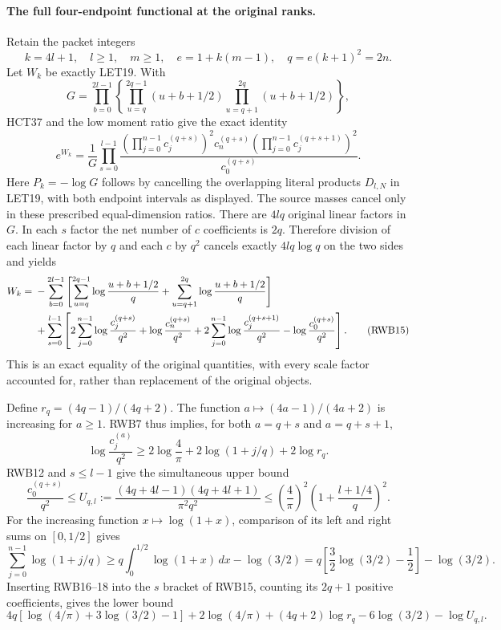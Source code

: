 \documentclass[11pt,a4paper]{article}
\begin{document}
\paragraph{The full four-endpoint functional at the original ranks.}
Retain the packet integers
\[
 k=4l+1,\quad l\ge1,\quad m\ge1,\quad
 e=1+k(m-1),\quad q=e(k+1)^2=2n.
 \tag{RWB13}
\]
Let $W_k$ be exactly LET19. With
\[
 G=\prod_{b=0}^{2l-1}
 \left\{\prod_{u=q}^{2q-1}(u+b+1/2)
         \prod_{u=q+1}^{2q}(u+b+1/2)\right\},
\]
HCT37 and the low moment ratio give the exact identity
\[
 e^{W_k}=\frac1G\prod_{s=0}^{l-1}
 \frac{\displaystyle
       \left(\prod_{j=0}^{n-1}c_j^{(q+s)}\right)^2
       c_n^{(q+s)}
       \left(\prod_{j=0}^{n-1}c_j^{(q+s+1)}\right)^2}
      {c_0^{(q+s)}}.
 \tag{RWB14}
\]
Here $P_k=-\log G$ follows by cancelling the overlapping literal
products $D_{l,N}$ in LET19, with both endpoint intervals as displayed.
The source masses cancel only in these prescribed equal-dimension
ratios. There are $4lq$ original linear factors in $G$. In each $s$
factor the net number of $c$ coefficients is $2q$. Therefore division
of each linear factor by $q$ and each $c$ by $q^2$ cancels exactly
$4lq\log q$ on the two sides and yields
\begin{align}
 W_k={}&-\sum_{b=0}^{2l-1}
 \left[\sum_{u=q}^{2q-1}\log\frac{u+b+1/2}{q}
       +\sum_{u=q+1}^{2q}\log\frac{u+b+1/2}{q}\right]\notag\\
 &+\sum_{s=0}^{l-1}\left[
 2\sum_{j=0}^{n-1}\log\frac{c_j^{(q+s)}}{q^2}
 +\log\frac{c_n^{(q+s)}}{q^2}
 +2\sum_{j=0}^{n-1}\log\frac{c_j^{(q+s+1)}}{q^2}
 -\log\frac{c_0^{(q+s)}}{q^2}\right].
 \tag{RWB15}
\end{align}
This is an exact equality of the original quantities, with every scale
factor accounted for, rather than replacement of the original objects.

Define $r_q=(4q-1)/(4q+2)$. The function
$a\mapsto(4a-1)/(4a+2)$ is increasing for $a\ge1$. RWB7 thus implies,
for both $a=q+s$ and $a=q+s+1$,
\[
 \log\frac{c_j^{(a)}}{q^2}
 \ge2\log\frac4\pi+2\log(1+j/q)+2\log r_q.
 \tag{RWB16}
\]
RWB12 and $s\le l-1$ give the simultaneous upper bound
\[
 \frac{c_0^{(q+s)}}{q^2}\le
 U_{q,l}:=\frac{(4q+4l-1)(4q+4l+1)}{\pi^2q^2}
 \le\left(\frac4\pi\right)^2
          \left(1+\frac{l+1/4}{q}\right)^2.
 \tag{RWB17}
\]
For the increasing function $x\mapsto\log(1+x)$, comparison of its
left and right sums on $[0,1/2]$ gives
\[
 \sum_{j=0}^{n-1}\log(1+j/q)
 \ge q\int_0^{1/2}\log(1+x)\,dx-\log(3/2)
 =q\left[\frac32\log(3/2)-\frac12\right]-\log(3/2).
 \tag{RWB18}
\]
Inserting RWB16--18 into the $s$ bracket of RWB15, counting its
$2q+1$ positive coefficients, gives the lower bound
\[
 4q\left[\log(4/\pi)+3\log(3/2)-1\right]
 +2\log(4/\pi)+(4q+2)\log r_q
 -6\log(3/2)-\log U_{q,l}.
 \tag{RWB19}
\]
\end{document}
